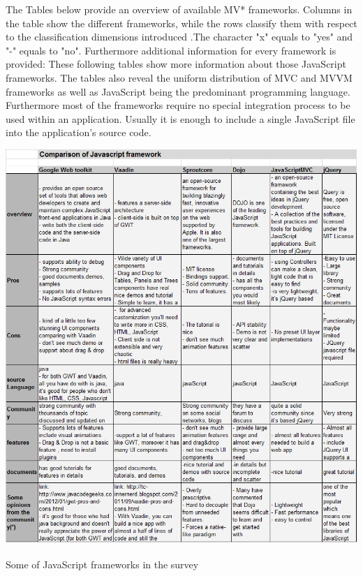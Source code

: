 \documentclass[14pt,a4paper]{extreport}
\begin{document}
The Tables below provide an overview of available MV* frameworks. Columns in the table show the different frameworks, while the  rows classify them with respect to the classification dimensions introduced .The character "x" equals to "yes" and "-" equals to "no". Furthermore additional information for every framework is provided: These following tables show more information about those JavaScript frameworks. The tables also reveal the uniform distribution of MVC and MVVM frameworks as well as JavaScript being the predominant programming language. Furthermore most of the frameworks require no special integration process to be used within an application. Usually it is enough to include a single JavaScript file into the application’s source code. 			
			\begin{table}
				\begin{center}
					\includegraphics[scale=0.6]{JavaFrameTable1.png}
				
					\caption{Some of JavaScript frameworks in the survey}
				\end{center}
			
			\end{table}
\end{document}

